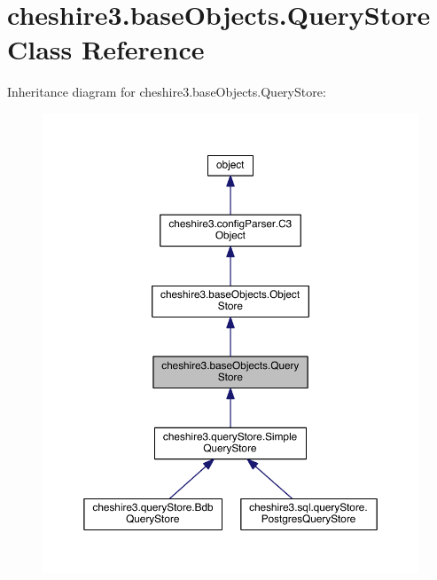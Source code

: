 \hypertarget{classcheshire3_1_1base_objects_1_1_query_store}{\section{cheshire3.\-base\-Objects.\-Query\-Store Class Reference}
\label{classcheshire3_1_1base_objects_1_1_query_store}
}


Inheritance diagram for cheshire3.\-base\-Objects.\-Query\-Store\-:
\nopagebreak
\begin{figure}[H]
\begin{center}
\leavevmode
\includegraphics[width=350pt]{classcheshire3_1_1base_objects_1_1_query_store__inherit__graph}
\end{center}
\end{figure}


